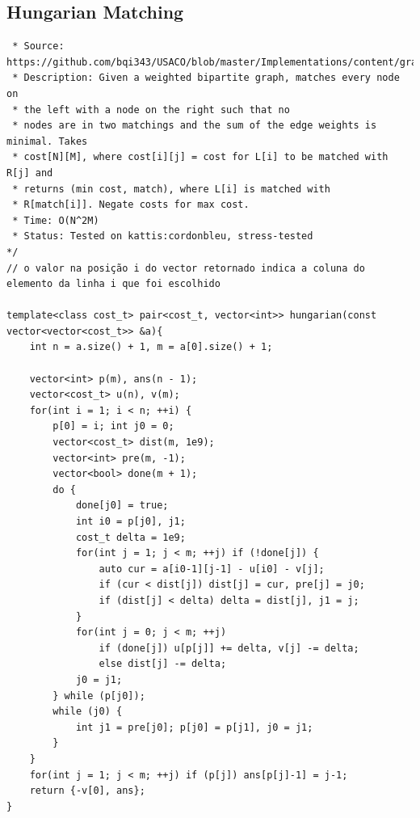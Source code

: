 \documentclass[11pt, a4paper, twoside]{article}
\begin{document}
\subsection{Hungarian Matching}
\begin{verbatim}
 * Source: https://github.com/bqi343/USACO/blob/master/Implementations/content/graphs%20(12)/Matching/Hungarian.h
 * Description: Given a weighted bipartite graph, matches every node on
 * the left with a node on the right such that no
 * nodes are in two matchings and the sum of the edge weights is minimal. Takes
 * cost[N][M], where cost[i][j] = cost for L[i] to be matched with R[j] and
 * returns (min cost, match), where L[i] is matched with
 * R[match[i]]. Negate costs for max cost.
 * Time: O(N^2M)
 * Status: Tested on kattis:cordonbleu, stress-tested
*/
// o valor na posição i do vector retornado indica a coluna do elemento da linha i que foi escolhido

template<class cost_t> pair<cost_t, vector<int>> hungarian(const vector<vector<cost_t>> &a){
    int n = a.size() + 1, m = a[0].size() + 1;
        
    vector<int> p(m), ans(n - 1);
    vector<cost_t> u(n), v(m); 
	for(int i = 1; i < n; ++i) { 
		p[0] = i; int j0 = 0;
		vector<cost_t> dist(m, 1e9);  
        vector<int> pre(m, -1); 
		vector<bool> done(m + 1);   
		do {
			done[j0] = true;
			int i0 = p[j0], j1; 
            cost_t delta = 1e9;
			for(int j = 1; j < m; ++j) if (!done[j]) {
				auto cur = a[i0-1][j-1] - u[i0] - v[j];
				if (cur < dist[j]) dist[j] = cur, pre[j] = j0;
				if (dist[j] < delta) delta = dist[j], j1 = j;
			}
			for(int j = 0; j < m; ++j)
				if (done[j]) u[p[j]] += delta, v[j] -= delta;
				else dist[j] -= delta;
			j0 = j1;
		} while (p[j0]);
		while (j0) { 
			int j1 = pre[j0]; p[j0] = p[j1], j0 = j1;
		}
	}
	for(int j = 1; j < m; ++j) if (p[j]) ans[p[j]-1] = j-1;
	return {-v[0], ans}; 
}
\end{verbatim}
\end{document}
